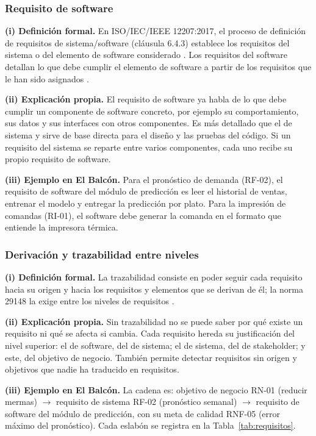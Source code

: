 \subsubsection{Requisito de software}
\textbf{(i) Definici\'on formal.} En ISO/IEC/IEEE 12207:2017, el proceso de definici\'on de requisitos de sistema/software (cl\'ausula 6.4.3) establece los requisitos del sistema o del elemento de software considerado \cite{iso12207}. Los requisitos del software detallan lo que debe cumplir el elemento de software a partir de los requisitos que le han sido asignados \cite{ieee29148}.
\par
\textbf{(ii) Explicaci\'on propia.} El requisito de software ya habla de lo que debe cumplir un componente de software concreto, por ejemplo su comportamiento, sus datos y sus interfaces con otros componentes. Es m\'as detallado que el de sistema y sirve de base directa para el dise\~no y las pruebas del c\'odigo. Si un requisito del sistema se reparte entre varios componentes, cada uno recibe su propio requisito de software.\par
\textbf{(iii) Ejemplo en El Balc\'on.} Para el pron\'ostico de demanda (RF-02), el requisito de software del m\'odulo de predicci\'on es leer el historial de ventas, entrenar el modelo y entregar la predicci\'on por plato. Para la impresi\'on de comandas (RI-01), el software debe generar la comanda en el formato que entiende la impresora t\'ermica.\par

\subsubsection{Derivaci\'on y trazabilidad entre niveles}
\textbf{(i) Definici\'on formal.} La trazabilidad consiste en poder seguir cada requisito hacia su origen y hacia los requisitos y elementos que se derivan de \'el; la norma 29148 la exige entre los niveles de requisitos \cite{ieee29148}.\par
\textbf{(ii) Explicaci\'on propia.} Sin trazabilidad no se puede saber por qu\'e existe un requisito ni qu\'e se afecta si cambia. Cada requisito hereda su justificaci\'on del nivel superior: el de software, del de sistema; el de sistema, del de stakeholder; y este, del objetivo de negocio. Tambi\'en permite detectar requisitos sin origen y objetivos que nadie ha traducido en requisitos.\par
\textbf{(iii) Ejemplo en El Balc\'on.} La cadena es: objetivo de negocio RN-01 (reducir mermas) $\rightarrow$ requisito de sistema RF-02 (pron\'ostico semanal) $\rightarrow$ requisito de software del m\'odulo de predicci\'on, con su meta de calidad RNF-05 (error m\'aximo del pron\'ostico). Cada eslab\'on se registra en la Tabla~\ref{tab:requisitos}.\par

